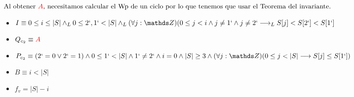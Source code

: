 \documentclass[10pt,a4paper]{article}
\begin{document}
$\text{Al obtener $\textcolor{red}{A}$, necesitamos calcular el Wp de un ciclo por lo que tenemos que usar el Teorema del invariante.}$
\begin{itemize}




    \item $I \equiv 0\leq i\leq |S| \land_L 0\leq 2` , 1` < |S| \land_L (\forall j : \ent)(0\leq j < i \land j\neq 1` \land j \neq 2`\longrightarrow_L S[j]<S[2`]<S[1`]$
    \item $Q_{c_2} \equiv \textcolor{red}{A}$
    \item $P_{c_2} \equiv (2`=0 \lor 2`=1) \land 0\leq 1` <|S| \land 1`\neq 2`\land i=0 \land |S|\geq 3 \land (\forall j: \ent)(0\leq j < |S| \longrightarrow S[j]\leq S[1`])$ 
    \item $B \equiv i<|S|$
    \item $f_v = |S|-i$




    
\end{itemize}
\end{document}

